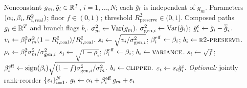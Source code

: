 \begin{algorithm}[t]
\caption{Hybrid single-index model (SIM) composition with variance correction.}
\label{alg:hybrid}
\small
\begin{algorithmic}[1]
  \REQUIRE Nonconstant $g_m,\tilde{g}_i\in\mathbb{R}^T$, $i=1,\dots,N$; each
    $\tilde{g}_i$ is independent of $g_m$.
  \REQUIRE Parameters $(\alpha_i,\beta_i,R^2_{i,\mathrm{real}})$; floor
    $f\in(0,1)$; threshold $R^2_{\mathrm{preserve}}\in(0,1]$.
  \ENSURE Composed paths $g_i\in\mathbb{R}^T$ and branch flags $b_i$.
  \STATE $\sigma_m^2 \gets \operatorname{Var}(g_m)$.
    \STATE $\sigma_{\mathrm{gen},i}^2 \gets \operatorname{Var}(\tilde{g}_i)$;
      $\tilde{g}_i^{\mathrm c} \gets \tilde{g}_i-\overline{\tilde{g}}_i$.
      \STATE $v_i \gets \beta_i^2\sigma_m^2(1-R^2_{i,\mathrm{real}})/R^2_{i,\mathrm{real}}$.
      \STATE $s_i \gets \sqrt{v_i/\sigma_{\mathrm{gen},i}^2}$;
        $\beta_i^{\mathrm{eff}} \gets \beta_i$; $b_i\gets\textsc{r2-preserve}$.
    \ELSE
      \STATE $\rho_i \gets \beta_i^2 \sigma_m^2 / \sigma_{\mathrm{gen},i}^2$
        \STATE $s_i \gets \sqrt{1-\rho_i}$;
          $\beta_i^{\mathrm{eff}}\gets\beta_i$; $b_i\gets\textsc{variance}$.
      \ELSE
        \STATE $s_i\gets\sqrt{f}$;
          $\beta_i^{\mathrm{eff}}\gets\operatorname{sign}(\beta_i)
          \sqrt{(1-f)\sigma_{\mathrm{gen},i}^2/\sigma_m^2}$.
        \STATE $b_i\gets\textsc{clipped}$.
      \ENDIF
    \ENDIF
    \STATE $\varepsilon_i \gets s_i\tilde{g}_i^{\mathrm c}$.
  \ENDFOR
  \STATE \textit{Optional:} jointly rank-reorder $\{\varepsilon_i\}_{i=1}^{N}$.
    \STATE $g_i \gets \alpha_i + \beta_i^{\mathrm{eff}}\, g_m + \varepsilon_i$
      \hfill {}
  \ENDFOR
\end{algorithmic}
\end{algorithm}

\FloatBarrier

